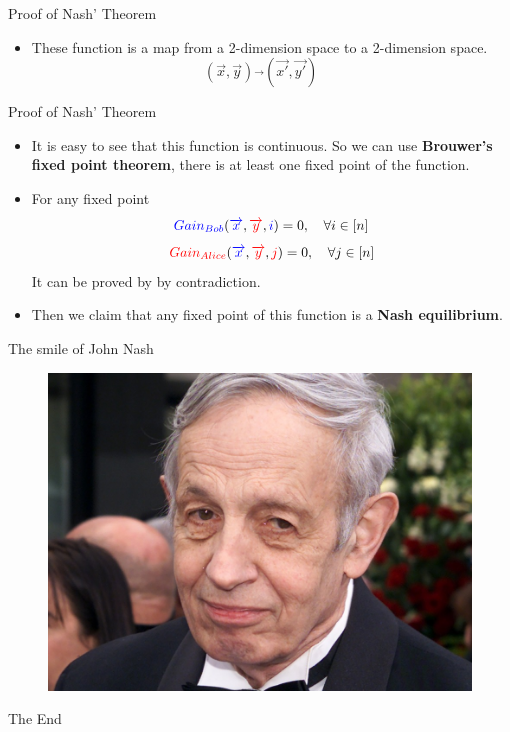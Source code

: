 \documentclass{beamer}
\begin{document}
\begin{frame}[fragile]{Proof of Nash' Theorem}
	\begin{itemize}[<+->]
		\item These function is a map from a 2-dimension space to a 2-dimension space.
		\begin{equation}
		(\overrightarrow{x}, \overrightarrow{y}) \overrightarrow{}(\overrightarrow{x'}, \overrightarrow{y'})\ \  \ \ \ \ \  \nonumber
		\end{equation}
	\end{itemize}
\end{frame}

\begin{frame}[fragile]{Proof of Nash' Theorem}
	\begin{itemize}[<+->]
		\item It is easy to see that this function is continuous. So we can use \textbf{Brouwer’s fixed point theorem}, there is at least one fixed point of the function.
		\item For any fixed point
		\begin{equation}
		{\color{blue}Gain_{Bob}} ({\color{blue}\overrightarrow{x}}, {\color{red}\overrightarrow{y}}, {\color{blue}i}) = 0, \ \ \  \forall i\in [n] \nonumber
		\end{equation}
		\begin{equation}
		{\color{red}Gain_{Alice}} ({\color{blue}\overrightarrow{x}}, {\color{red}\overrightarrow{y}}, {\color{red}j}) = 0, \ \ \  \forall j\in [n]\nonumber
		\end{equation}
		It can be proved by by contradiction.
		\item Then we claim that any fixed point of this function is a \textbf{Nash equilibrium}.
	\end{itemize}
\end{frame}

\begin{frame}[fragile]{The smile of John Nash}
	\begin{figure}[H]
		\centering
		\includegraphics[width=0.7\linewidth]{002.jpeg}\vspace{-10pt}
		\nonumber\vspace{-10pt}
	\end{figure}
\end{frame}


\begin{frame}
\Huge{\centerline{The End}}
\end{frame}
\end{document}
